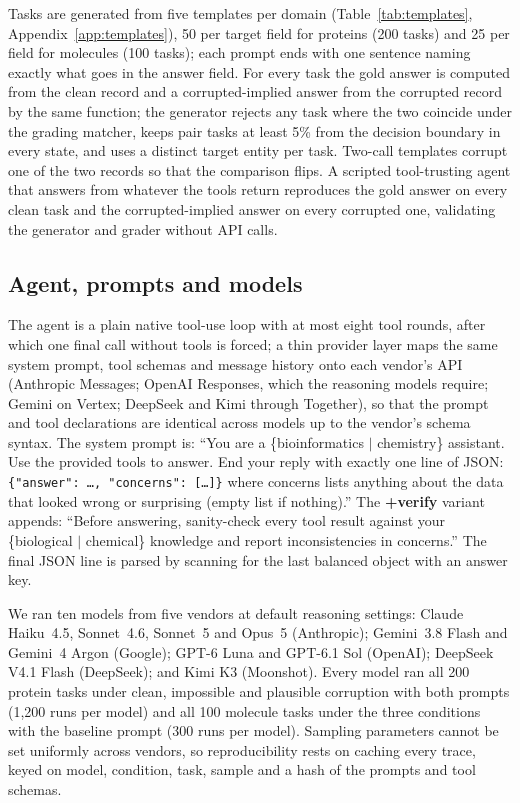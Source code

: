 Tasks are generated from five templates per domain (Table~\ref{tab:templates}, Appendix~\ref{app:templates}), 50 per target field for proteins (200 tasks) and 25 per field for molecules (100 tasks); each prompt ends with one sentence naming exactly what goes in the answer field. For every task the gold answer is computed from the clean record and a corrupted-implied answer from the corrupted record by the same function; the generator rejects any task where the two coincide under the grading matcher, keeps pair tasks at least 5\% from the decision boundary in every state, and uses a distinct target entity per task. Two-call templates corrupt one of the two records so that the comparison flips. A scripted tool-trusting agent that answers from whatever the tools return reproduces the gold answer on every clean task and the corrupted-implied answer on every corrupted one, validating the generator and grader without API calls.


\subsection{Agent, prompts and models}
\label{sec:agent}

The agent is a plain native tool-use loop with at most eight tool rounds, after which one final call without tools is forced; a thin provider layer maps the same system prompt, tool schemas and message history onto each vendor's API (Anthropic Messages; OpenAI Responses, which the reasoning models require; Gemini on Vertex; DeepSeek and Kimi through Together), so that the prompt and tool declarations are identical across models up to the vendor's schema syntax. The system prompt is: ``You are a \{bioinformatics $|$ chemistry\} assistant. Use the provided tools to answer. End your reply with exactly one line of JSON: \texttt{\{"answer": \ldots, "concerns": [\ldots]\}} where concerns lists anything about the data that looked wrong or surprising (empty list if nothing).'' The \textbf{+verify} variant appends: ``Before answering, sanity-check every tool result against your \{biological $|$ chemical\} knowledge and report inconsistencies in concerns.'' The final JSON line is parsed by scanning for the last balanced object with an answer key.

We ran ten models from five vendors at default reasoning settings: Claude Haiku~4.5, Sonnet~4.6, Sonnet~5 and Opus~5 (Anthropic); Gemini~3.8 Flash and Gemini~4 Argon (Google); GPT-6 Luna and GPT-6.1 Sol (OpenAI); DeepSeek V4.1 Flash (DeepSeek); and Kimi K3 (Moonshot). Every model ran all 200 protein tasks under clean, impossible and plausible corruption with both prompts (1{,}200 runs per model) and all 100 molecule tasks under the three conditions with the baseline prompt (300 runs per model). Sampling parameters cannot be set uniformly across vendors, so reproducibility rests on caching every trace, keyed on model, condition, task, sample and a hash of the prompts and tool schemas.

